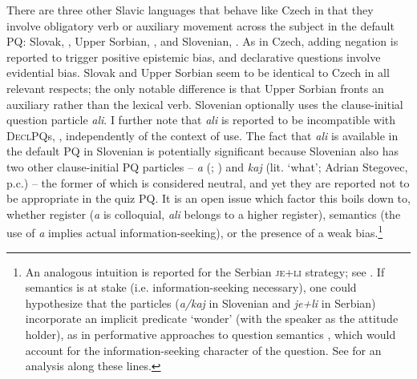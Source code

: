 \documentclass[output=paper,colorlinks,citecolor=brown]{langscibook}
\begin{document}
\noindent There are three other Slavic languages that behave like Czech in that they involve obligatory verb or auxiliary movement across the subject in the default PQ: Slovak, , Upper Sorbian, , and Slovenian, . As in Czech, adding negation is reported to trigger positive epistemic bias, and declarative questions involve evidential bias. Slovak and Upper Sorbian seem to be identical to Czech in all relevant respects; the only notable difference is that Upper Sorbian fronts an auxiliary rather than the lexical verb. Slovenian optionally uses the clause-initial question particle \textit{ali}. I further note that \textit{ali} is reported to be incompatible with \textsc{DeclPQ}s, , independently of the context of use. The fact that \textit{ali} is available in the default PQ in Slovenian is potentially significant because Slovenian also has two other clause-initial PQ particles -- \textit{a} (\citealt[165]{Greenberg2006}; \citealt[153]{Stegovec2017}) and \textit{kaj} (lit. `what'; Adrian Stegovec, p.c.) -- the former of which is considered neutral, and yet they are reported not to be appropriate in the quiz PQ. It is an open issue which factor this boils down to, whether register (\textit{a} is colloquial, \textit{ali} belongs to a higher register), semantics (the use of \textit{a} implies actual information-seeking), or the presence of a weak bias.\footnote{An analogous intuition is reported for the Serbian \textsc{je+li} strategy; see . If semantics is at stake (i.e. information-seeking necessary), one could hypothesize that the particles (\textit{a/kaj} in Slovenian and \textit{je+li} in Serbian) incorporate an implicit predicate `wonder' (with the speaker as the attitude holder), as in performative approaches to question semantics \citep{Lewis1970,Krifka2023}, which would account for the information-seeking character of the question. See  for an analysis along these lines.\label{sim:fn:slvn.ser}}

\ea\label{sim:ex:just-slvk}
\z\z
\end{document}
